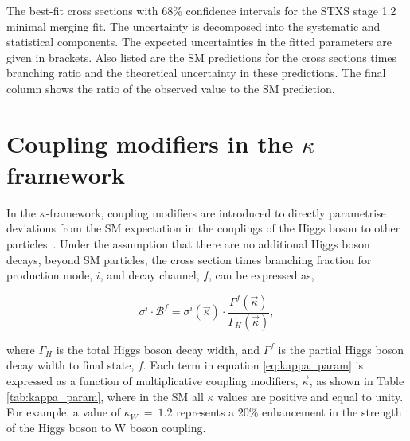 \begin{table}[htbp]
  \centering
  \scriptsize
  \renewcommand{\arraystretch}{1.8}
  \setlength{\tabcolsep}{2.2pt}
  \caption{
    The best-fit cross sections with 68\% confidence intervals for the STXS stage 1.2 minimal merging fit. The uncertainty is decomposed into the systematic and statistical components. The expected uncertainties in the fitted parameters are given in brackets. Also listed are the SM predictions for the cross sections times branching ratio and the theoretical uncertainty in these predictions. The final column shows the ratio of the observed value to the SM prediction.
  }
  \label{tab:stage1p2_minimal_results}
  \hspace*{-1cm}
  
  \hspace*{-1cm}
\end{table}

\newpage
\section{Coupling modifiers in the $\kappa$ framework}\label{sec:results_kappa}
In the $\kappa$-framework, coupling modifiers are introduced to directly parametrise deviations from the SM expectation in the couplings of the Higgs boson to other particles~\cite{Heinemeyer:2013tqa}. Under the assumption that there are no additional Higgs boson decays, beyond SM particles, the cross section times branching fraction for production mode, $i$, and decay channel, $f$, can be expressed as,

\begin{equation}\label{eq:kappa_param}
    \sigma^i \cdot \mathcal{B}^f = \sigma^i(\vec{\kappa}) \cdot \frac{\Gamma^f(\vec{\kappa})}{\Gamma_H(\vec{\kappa})},
\end{equation}

\noindent
where $\Gamma_H$ is the total Higgs boson decay width, and $\Gamma^f$ is the partial Higgs boson decay width to final state, $f$. Each term in equation \ref{eq:kappa_param} is expressed as a function of multiplicative coupling modifiers, $\vec{\kappa}$, as shown in Table \ref{tab:kappa_param}, where in the SM all $\kappa$ values are positive and equal to unity. For example, a value of $\kappa_W~=~1.2$ represents a 20\% enhancement in the strength of the Higgs boson to W boson coupling.

